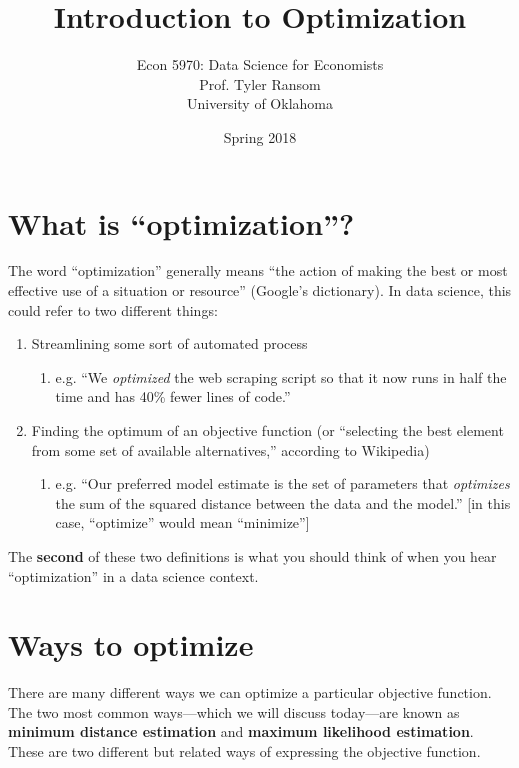\documentclass[12pt,english]{article}
\begin{document}
\title{Introduction to Optimization}
\author{Econ 5970: Data Science for Economists\\ Prof. Tyler Ransom\\ University of Oklahoma}
\date{Spring 2018}
\maketitle

\section{What is ``optimization''?}

The word ``optimization'' generally means ``the action of making the best or most effective use of a situation or resource'' (Google's dictionary). In data science, this could refer to two different things:
\begin{enumerate}
    \item Streamlining some sort of automated process
    \begin{enumerate}
        \item e.g. ``We \emph{optimized} the web scraping script so that it now runs in half the time and has 40\% fewer lines of code.''
    \end{enumerate}
    \item Finding the optimum of an objective function (or ``selecting the best element from some set of available alternatives,'' according to Wikipedia)
    \begin{enumerate}
        \item e.g. ``Our preferred model estimate is the set of parameters that \emph{optimizes} the sum of the squared distance between the data and the model.'' {[}in this case, ``optimize'' would mean ``minimize''{]}
    \end{enumerate}
\end{enumerate}
The \textbf{second} of these two definitions is what you should think of when you hear ``optimization'' in a data science context.

\section{Ways to optimize}
There are many different ways we can optimize a particular objective function. The two most common ways---which we will discuss today---are known as \textbf{minimum distance estimation} and \textbf{maximum likelihood estimation}. These are two different but related ways of expressing the objective function.
\end{document}
